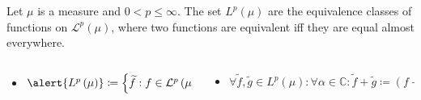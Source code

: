 \begin{frame}
	\begin{definition}
		Let $\mu$ is a measure and $0<p\leq\infty$.
		The set $L^{p}\left(\mu\right)$ are the
		\alert{equivalence classes of functions} on
		\begin{math}
			\mathcal{L}^{p}\left(\mu\right)
		\end{math},
		where two functions are equivalent iff they are equal almost
		everywhere.
		\begin{columns}
			\begin{column}{0.42\textwidth}
				\begin{itemize}
					\item

					      \begin{math}
						      \alert{
							      L^{p}\left(\mu\right)
						      }
						      \coloneqq
						      \left\{
						      \widetilde{f}:
						      f\in\mathcal{L}^{p}\left(\mu\right)
						      \right\}=
						      \mathcal{L}^{p}
						      \left(\mu\right)/\mathcal{Z}\left(\mu\right).
					      \end{math}
				\end{itemize}
			\end{column}
			\begin{column}{0.54\textwidth}
				\begin{itemize}
					\item

					      \begin{math}
						      \forall\widetilde{f},\widetilde{g}\in
						      L^{p}\left(\mu\right):
						      \forall\alpha\in\mathds{C}:
						      \widetilde{f}+\widetilde{g}\coloneqq
						      {\left(f+g\right)}^{\widetilde{}},\quad
						      \alpha\widetilde{f}\coloneqq
						      {\left(\alpha f\right)}^{\widetilde{}}.
					      \end{math}
				\end{itemize}
			\end{column}
		\end{columns}
	\end{definition}
\end{frame}

